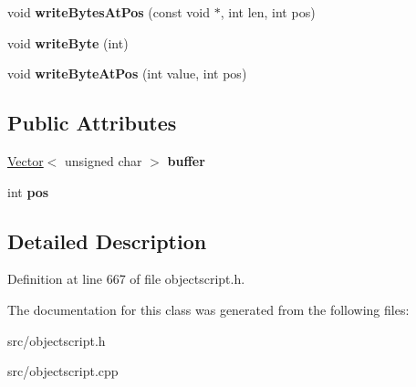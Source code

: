 \begin{DoxyCompactItemize}
\item 
void {\bfseries write\+Bytes\+At\+Pos} (const void $\ast$, int len, int pos)\hypertarget{class_object_script_1_1_o_s_1_1_core_1_1_mem_stream_writer_abfd6062b804305bec5ec193b9cfb1afb}{}\label{class_object_script_1_1_o_s_1_1_core_1_1_mem_stream_writer_abfd6062b804305bec5ec193b9cfb1afb}

\item 
void {\bfseries write\+Byte} (int)\hypertarget{class_object_script_1_1_o_s_1_1_core_1_1_mem_stream_writer_a5f7fb1c7328a0d584c55bc84bc4f6dd3}{}\label{class_object_script_1_1_o_s_1_1_core_1_1_mem_stream_writer_a5f7fb1c7328a0d584c55bc84bc4f6dd3}

\item 
void {\bfseries write\+Byte\+At\+Pos} (int value, int pos)\hypertarget{class_object_script_1_1_o_s_1_1_core_1_1_mem_stream_writer_ae30870d32064281ca643a017df17fb80}{}\label{class_object_script_1_1_o_s_1_1_core_1_1_mem_stream_writer_ae30870d32064281ca643a017df17fb80}

\end{DoxyCompactItemize}
\subsection*{Public Attributes}
\begin{DoxyCompactItemize}
\item 
\hyperlink{struct_object_script_1_1_o_s_1_1_vector}{Vector}$<$ unsigned char $>$ {\bfseries buffer}\hypertarget{class_object_script_1_1_o_s_1_1_core_1_1_mem_stream_writer_a2f8373d46635020c1c0f0b07121b109e}{}\label{class_object_script_1_1_o_s_1_1_core_1_1_mem_stream_writer_a2f8373d46635020c1c0f0b07121b109e}

\item 
int {\bfseries pos}\hypertarget{class_object_script_1_1_o_s_1_1_core_1_1_mem_stream_writer_a9b8e8504dd57aa3fc2a3c291b9577884}{}\label{class_object_script_1_1_o_s_1_1_core_1_1_mem_stream_writer_a9b8e8504dd57aa3fc2a3c291b9577884}

\end{DoxyCompactItemize}


\subsection{Detailed Description}


Definition at line 667 of file objectscript.\+h.



The documentation for this class was generated from the following files\+:\begin{DoxyCompactItemize}
\item 
src/objectscript.\+h\item 
src/objectscript.\+cpp\end{DoxyCompactItemize}
